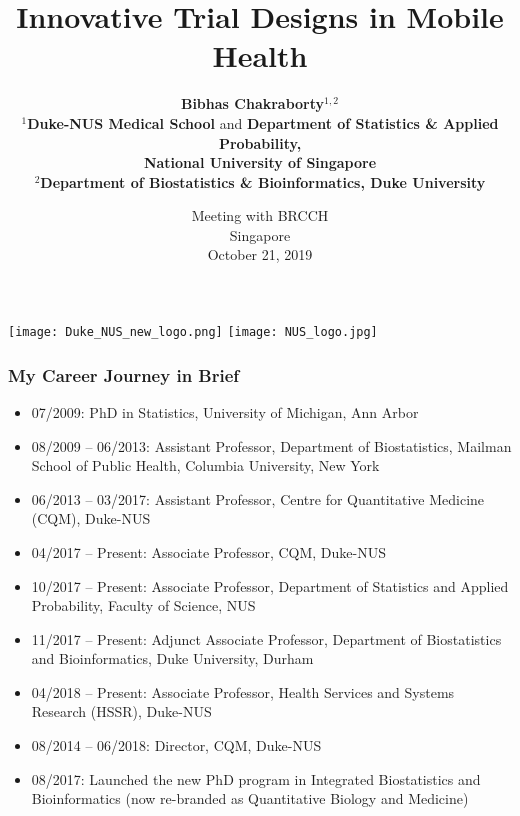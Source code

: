 \documentclass[10pt,xcolor=dvipsnames]{beamer}
\title{Innovative Trial Designs in Mobile Health}
\author{{\bf Bibhas Chakraborty}$^{1,2}$\\ \small{ $^1${\bf Duke-NUS Medical School} and {\bf Department of Statistics \& Applied Probability,}\\ {\bf National University of Singapore}\\  $^2${\bf Department of Biostatistics \& Bioinformatics, Duke University}}}
\institute{{\color{blue}bibhas.chakraborty@duke-nus.edu.sg}}
\date{\small{Meeting with BRCCH\\Singapore\\ October 21, 2019}}
\begin{document}
\begin{frame}%
\titlepage
\begin{center}
\texttt{[image: Duke\_NUS\_new\_logo.png]}
\hspace*{5cm}
\texttt{[image: NUS\_logo.jpg]}%
\end{center}
\end{frame}



\begin{frame}[plain]
\frametitle{My Career Journey in Brief}
\begin{itemize}
\item 07/2009: PhD in Statistics, University of Michigan, Ann Arbor
\item 08/2009 -- 06/2013: Assistant Professor, Department of Biostatistics, Mailman School of Public Health, Columbia University, New York
\bigskip
\item 06/2013 -- 03/2017: Assistant Professor, Centre for Quantitative Medicine (CQM), Duke-NUS
\item 04/2017 -- Present: Associate Professor, CQM, Duke-NUS 
\item 10/2017 -- Present: Associate Professor, Department of Statistics and Applied Probability, Faculty of Science, NUS
\item 11/2017 -- Present: Adjunct Associate Professor, Department of Biostatistics and Bioinformatics, Duke University, Durham
\item 04/2018 -- Present: Associate Professor, Health Services and Systems Research (HSSR), Duke-NUS
\bigskip
\item {\color{blue}08/2014 -- 06/2018: Director, CQM, Duke-NUS}
\item {\color{blue}08/2017: Launched the new PhD program in Integrated Biostatistics and Bioinformatics (now re-branded as Quantitative Biology and Medicine)} 
\end{itemize}
\end{frame}
\end{document}
